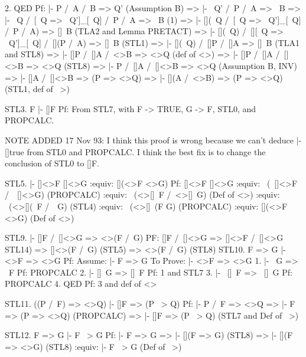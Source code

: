 \begin{spec}
2. QED
   Pf: |- P /\ A /\ B => Q'                     (Assumption B)
        => |-  ~Q' /\ P /\ A =>  ~B       
        => |- ~Q /\ [~Q => ~Q']_[~Q] /\ P /\ A =>  ~B     (1)
        => |- [](~Q /\ [~Q => ~Q']_[~Q] /\ P /\ A) =>  []~B  
                                              (TLA2 and Lemma PRETACT)
        => |- [](~Q) /\ [][~Q => ~Q']_[~Q] /\ [](P /\ A) =>  []~B  
                                                         (STL1)
        => |- [](~Q) /\ []P /\ []A =>  []~B    (TLA1 and STL8)
        => |- []P /\ []A /\ <>B  => <>Q            (def of <>)
        => |- []P /\ []A /\ []<>B => <>Q                (STL8)
        => |- P /\ []A /\ []<>B => <>Q      (Assumption B, INV)
        => |- []A /\ []<>B => (P => <>Q)    
        => |- [](A /\ <>B) => (P => <>Q)  (STL1, def of ~>)

  STL3. F |- []F
        Pf: From STL7, with F -> TRUE, G -> F, STL0, and PROPCALC.

        NOTE ADDED 17 Nov 93: I think this proof is wrong because we
        can't deduce |- []true from STL0 and PROPCALC.  I think the
        best fix is to change the conclusion of STL0 to []F.

  STL5. |- []<>F \/ []<>G :equiv: [](<>F \/ <>G)
        Pf: []<>F \/ []<>G 
            :equiv: ~(~[]<>F /\ ~[]<>G)    (PROPCALC)
            :equiv: ~(<>[]~F /\ <>[]~G)   (Def of <>)
            :equiv: ~(<>[](~F /\ ~G)           (STL4)
            :equiv: ~(<>[]~(F \/ G)        (PROPCALC)
            :equiv: [](<>F \/ <>G)        (Def of <>)

  STL9. |- []F /\ []<>G => <>(F /\ G)
        PF: []F /\ []<>G 
               => []<>F /\ []<>G      STL14)
               => []<>(F /\ G)        (STL5)
               => <>(F /\ G)          (STL8)
  STL10. F => G |- <>F => <>G
         Pf: Assume:   |- F => G
             To Prove: |- <>F => <>G
             1. |- ~G => ~F
                Pf: PROPCALC
             2. |- []~G => []~F
                Pf: 1 and STL7
             3. |- ~[]~F => ~[]~G 
                Pf: PROPCALC
             4. QED
                Pf: 3 and def of <>

  STL11. ((P /\ F) => <>Q) |- []F => (P ~> Q)
         Pf: |- P /\ F => <>Q
              => |- F => (P => <>Q)            (PROPCALC)
              => |- []F => (P ~> Q)  (STL7 and Def of ~>)

  STL12. F => G |- F ~> G
         Pf: |- F => G
               => |- [](F => G)         (STL8)
               => |- [](F => <>G)       (STL8)
               :equiv: |- F ~> G   (Def of ~>)


\end{spec}
